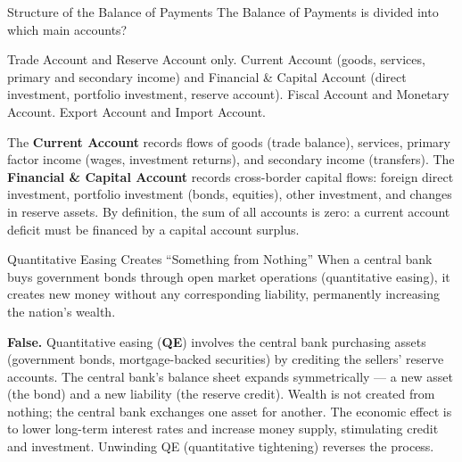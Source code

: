 \documentclass[paper=a5]{scrartcl}
\begin{document}
\begin{question}[type=mc]{Structure of the Balance of Payments}
The Balance of Payments is divided into which main accounts?
\begin{choices}
  \choice        Trade Account and Reserve Account only.
  \correctchoice Current Account (goods, services, primary and secondary
                 income) and Financial \& Capital Account (direct investment,
                 portfolio investment, reserve account).
  \choice        Fiscal Account and Monetary Account.
  \choice        Export Account and Import Account.
\end{choices}
\begin{solution}
  The \textbf{Current Account} records flows of goods (trade balance),
  services, primary factor income (wages, investment returns), and
  secondary income (transfers). The \textbf{Financial \& Capital Account}
  records cross-border capital flows: foreign direct investment, portfolio
  investment (bonds, equities), other investment, and changes in reserve
  assets. By definition, the sum of all accounts is zero: a current account
  deficit must be financed by a capital account surplus.
\end{solution}
\end{question}

\begin{question}[type=tf]{Quantitative Easing Creates ``Something from Nothing''}
When a central bank buys government bonds through open market operations
(quantitative easing), it creates new money without any corresponding
liability, permanently increasing the nation's wealth.
\truefalse[false]
\begin{solution}
  \textbf{False.} Quantitative easing (\textbf{QE}) involves the central
  bank purchasing assets (government bonds, mortgage-backed securities) by
  crediting the sellers' reserve accounts. The central bank's balance sheet
  expands symmetrically --- a new asset (the bond) and a new liability
  (the reserve credit). Wealth is not created from nothing; the central bank
  exchanges one asset for another. The economic effect is to lower long-term
  interest rates and increase money supply, stimulating credit and investment.
  Unwinding QE (quantitative tightening) reverses the process.
\end{solution}
\end{question}
\end{document}
